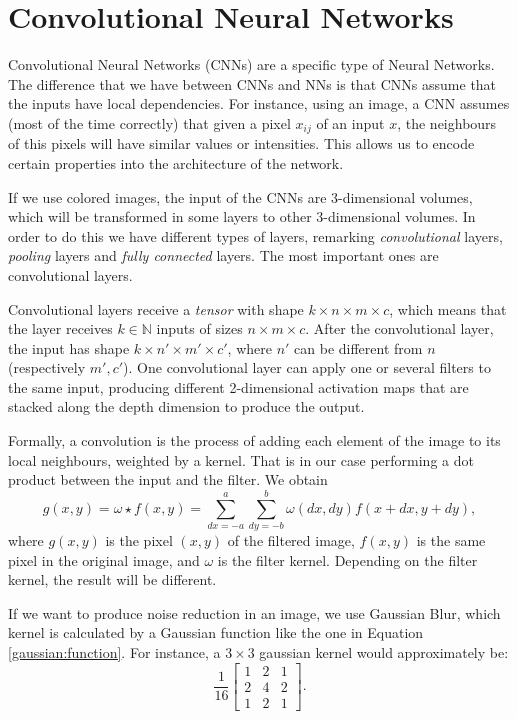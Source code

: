 \section{Convolutional Neural Networks}

Convolutional Neural Networks (CNNs) are a specific type of Neural Networks. The difference that we have between CNNs and NNs is that CNNs assume that the inputs have local dependencies. For instance, using an image, a CNN assumes (most of the time correctly) that given a pixel $x_{ij}$ of an input $x$, the neighbours of this pixels will have similar values or intensities. This allows us to encode certain properties into the architecture of the network.

If we use colored images, the input of the CNNs are 3-dimensional volumes, which will be transformed in some layers to other 3-dimensional volumes. In order to do this we have different types of layers, remarking \emph{convolutional} layers, \emph{pooling} layers and \emph{fully connected} layers. The most important ones are convolutional layers.

Convolutional layers receive a \emph{tensor} with shape $k \times n \times m \times c$, which means that the layer receives $k \in \mathbb N$ inputs of sizes $n \times m \times c$.  After the convolutional layer, the input has shape $k \times n' \times m' \times c'$, where $n'$ can be different from $n$ (respectively $m',c'$). One convolutional layer can apply one or several filters to the same input, producing different 2-dimensional activation maps that are stacked along the depth dimension to produce the output.

Formally, a convolution is the process of adding each element of the image to its local neighbours, weighted by a kernel. That is in our case performing a dot product between the input and the filter. We obtain
\[
g(x,y) = \omega \star f(x,y) = \sum_{dx = -a}^a \sum_{dy = -b}^b \omega(dx,dy)f(x+dx,y+dy),    
\]
where $g(x,y)$ is the pixel $(x,y)$ of the filtered image, $f(x,y)$ is the same pixel in the original image, and $\omega$ is the filter kernel. Depending on the filter kernel, the result will be different. 
\begin{nexample}
If we want to produce noise reduction in an image, we use Gaussian Blur, which kernel is calculated by a Gaussian function like the one in Equation \ref{gaussian:function}. For instance, a $3\times 3 $ gaussian kernel would approximately be:
\[
\frac{1}{16}\begin{bmatrix}
    1 & 2 & 1\\
    2 & 4 & 2\\
    1 & 2 & 1
\end{bmatrix}.
\]
\end{nexample}

